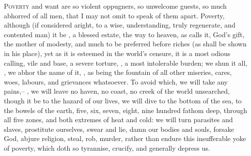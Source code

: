 \lettrine{P}{overty} and want are so violent oppugners, so unwelcome guests, so
much abhorred of all men, that I may not omit to speak of them apart. Poverty,
although (if considered aright, to a wise, understanding, truly regenerate, and
contented man) it be , a blessed estate, the way to heaven, as
\Chrysostom{} calls it, God's gift, the mother of modesty,
and much to be preferred before riches (as shall be shown in his
place), yet as it is esteemed in the world's censure, it
is a most odious calling, vile and base, a severe torture, ,
a most intolerable burden; we shun it all, , we abhor the name of it,
, as being
the fountain of all other miseries, cares, woes, labours, and grievances
whatsoever. To avoid which, we will take any pains,-- , we will leave no haven, no coast, no creek of the world
unsearched, though it be to the hazard of our lives, we will dive to the bottom
of the sea, to the bowels of the earth, five, six, seven,
eight, nine hundred fathom deep, through all five zones, and both extremes of
heat and cold: we will turn parasites and slaves, prostitute ourselves, swear
and lie, damn our bodies and souls, forsake God, abjure religion, steal, rob,
murder, rather than endure this insufferable yoke of poverty, which doth so
tyrannise, crucify, and generally depress us.

